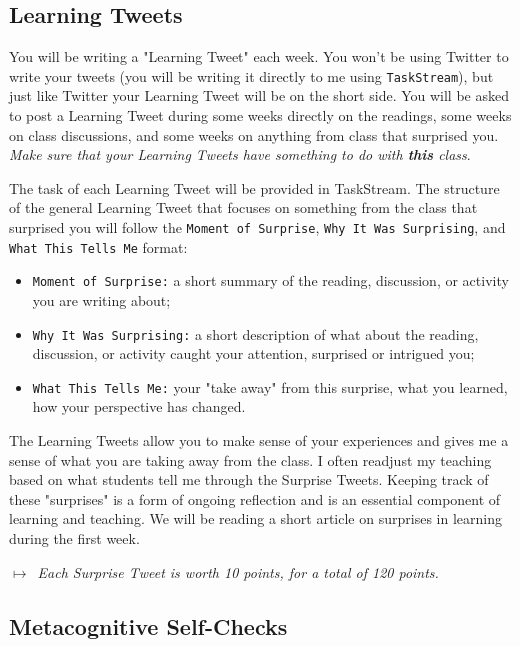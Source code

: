 \documentclass{tufte-handout}
\begin{document}
\subsection{Learning Tweets}
You will be writing a "Learning Tweet" each week. You won't be using Twitter to write your tweets (you will be writing it directly to me using \texttt{TaskStream}), but just like Twitter your Learning Tweet will be on the short side. You will be asked to post a Learning Tweet during some weeks directly on the readings, some weeks on class discussions, and some weeks on anything from class that surprised you. \emph{Make sure that your Learning Tweets have something to do with \textbf{this} class}.

The task of each Learning Tweet will be provided in TaskStream. The structure of the general Learning Tweet that focuses on something from the class that surprised you will follow the \texttt{Moment of Surprise}, \texttt{Why It Was Surprising}, and \texttt{What This Tells Me} format:

\begin{itemize}
	\itemsep-0.5em
	\item \texttt{Moment of Surprise:} a short summary of the reading, discussion, or activity you are writing about;
	\item \texttt{Why It Was Surprising:} a short description of what about the reading, discussion, or activity caught your attention, surprised or intrigued you;
	\item \texttt{What This Tells Me:} your "take away" from this surprise, what you learned, how your perspective has changed.
\end{itemize}

The Learning Tweets allow you to make sense of your experiences and gives me a sense of what you are taking away from the class. I often readjust my teaching based on what students tell me through the Surprise Tweets. Keeping track of these "surprises" is a form of ongoing reflection and is an essential component of learning and teaching. We will be reading a short article on surprises in learning during the first week.

\medskip\noindent\textit{$\mapsto$~Each Surprise Tweet is worth 10 points, for a total of 120 points.}

\subsection{Metacognitive Self-Checks}
\end{document}
